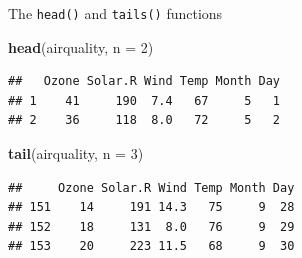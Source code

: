 \documentclass[ignorenonframetext,]{beamer}
\newenvironment{Shaded}{\begin{snugshade}}{\end{snugshade}}
\newcommand{\DataTypeTok}[1]{\textcolor[rgb]{0.13,0.29,0.53}{#1}}
\newcommand{\DecValTok}[1]{\textcolor[rgb]{0.00,0.00,0.81}{#1}}
\newcommand{\KeywordTok}[1]{\textcolor[rgb]{0.13,0.29,0.53}{\textbf{#1}}}
\newcommand{\NormalTok}[1]{#1}
\begin{document}
\begin{frame}[fragile]{The \texttt{head()} and \texttt{tails()}
functions}
\protect\hypertarget{the-head-and-tails-functions-1}{}

\begin{Shaded}
\begin{Highlighting}[]
\KeywordTok{head}\NormalTok{(airquality, }\DataTypeTok{n =} \DecValTok{2}\NormalTok{)}
\end{Highlighting}
\end{Shaded}

\begin{verbatim}
##   Ozone Solar.R Wind Temp Month Day
## 1    41     190  7.4   67     5   1
## 2    36     118  8.0   72     5   2
\end{verbatim}

\begin{Shaded}
\begin{Highlighting}[]
\KeywordTok{tail}\NormalTok{(airquality, }\DataTypeTok{n =} \DecValTok{3}\NormalTok{) }
\end{Highlighting}
\end{Shaded}

\begin{verbatim}
##     Ozone Solar.R Wind Temp Month Day
## 151    14     191 14.3   75     9  28
## 152    18     131  8.0   76     9  29
## 153    20     223 11.5   68     9  30
\end{verbatim}

\end{frame}
\end{document}
